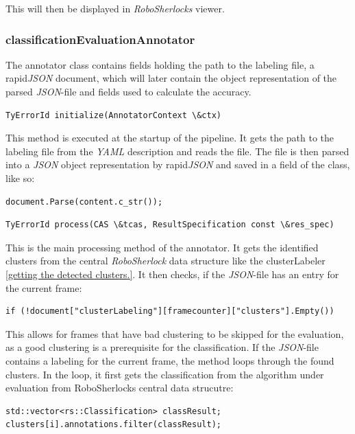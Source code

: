\documentclass[main.tex]{subfiles}
\begin{document}
This will then be displayed in \textit{RoboSherlocks} viewer.



\subsubsection{classificationEvaluationAnnotator}
The annotator class contains fields holding the path to the labeling file, a rapid\textit{JSON} document, which will later contain the object representation of the parsed \textit{JSON}-file and fields used to calculate the accuracy.

\begin{lstlisting}
TyErrorId initialize(AnnotatorContext \&ctx)
\end{lstlisting}

This method is executed at the startup of the pipeline.  It gets the path to the labeling file from the \textit{YAML} description and reads the file. The file is then parsed into a \textit{JSON} object representation by rapid\textit{JSON} and saved in a field of the class, like so:

\begin{lstlisting}
document.Parse(content.c_str());
\end{lstlisting}

\begin{lstlisting}
TyErrorId process(CAS \&tcas, ResultSpecification const \&res_spec)
\end{lstlisting}

This is the main processing method of the annotator. It gets the identified clusters from the central \textit{RoboSherlock} data structure like the clusterLabeler \ref{getting the detected clusters.}. It then checks, if the \textit{JSON}-file has an entry for the current frame: 

\begin{lstlisting}
if (!document["clusterLabeling"][framecounter]["clusters"].Empty())
\end{lstlisting}

This allows for frames that have bad clustering to be skipped for the evaluation, as a good clustering is a prerequisite for the classification. If the \textit{JSON}-file contains a labeling for the current frame, the method loops through the found clusters. In the loop, it first gets the classification from the algorithm under evaluation from RoboSherlocks central data strucutre:

\begin{lstlisting}
std::vector<rs::Classification> classResult;
clusters[i].annotations.filter(classResult);
\end{lstlisting}
\end{document}
